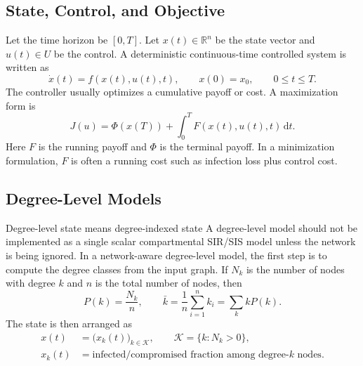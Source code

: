 \documentclass[11pt,a4paper]{article}
\newcommand{\R}{\mathbb{R}}
\newcommand{\dd}{\,\mathrm{d}}
\begin{document}
\subsection{State, Control, and Objective}

Let the time horizon be $[0,T]$. Let $x(t)\in\R^n$ be the state vector and $u(t)\in U$ be the control. A deterministic continuous-time controlled system is written as
\begin{equation}
  \dot{x}(t)=f(x(t),u(t),t),\qquad x(0)=x_0,\qquad 0\leq t\leq T.
  \label{eq:basic-dynamics}
\end{equation}
The controller usually optimizes a cumulative payoff or cost. A maximization form is
\begin{equation}
  J(u)=\Phi(x(T))+\int_0^T F(x(t),u(t),t)\dd t.
  \label{eq:basic-objective}
\end{equation}
Here $F$ is the running payoff and $\Phi$ is the terminal payoff. In a minimization formulation, $F$ is often a running cost such as infection loss plus control cost.


\subsection{Degree-Level Models}

\begin{definitionbox}{Degree-level state means degree-indexed state}
A degree-level model should not be implemented as a single scalar compartmental SIR/SIS model unless the network is being ignored. In a network-aware degree-level model, the first step is to compute the degree classes from the input graph. If $N_k$ is the number of nodes with degree $k$ and $n$ is the total number of nodes, then
\begin{equation}
  P(k)=\frac{N_k}{n},
  \qquad
  \bar{k}=\frac{1}{n}\sum_{i=1}^n k_i=\sum_k kP(k).
  \label{eq:degree-distribution}
\end{equation}
The state is then arranged as
\begin{equation}
\begin{aligned}
  x(t)&=\bigl(x_k(t)\bigr)_{k\in\mathcal{K}},\qquad
  \mathcal{K}=\{k:N_k>0\},\\
  x_k(t)&=\text{infected/compromised fraction among degree-}k\text{ nodes}.
\end{aligned}
  \label{eq:degree-state-vector}
\end{equation}
\end{definitionbox}
\end{document}
